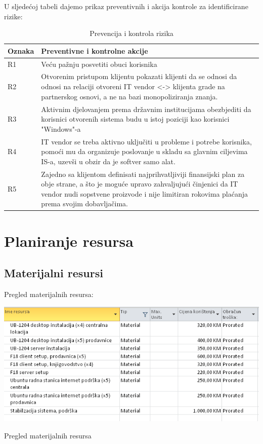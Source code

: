 \documentclass[times, utf8, seminar]{fit}
\begin{document}
U sljedećoj tabeli dajemo prikaz preventivnih i akcija kontrole za identificirane rizike:

\begin{table}[!h]
\centering
\begin{tabular}{|p{1.7cm}|p{13.2cm}|}
\hline
Oznaka & Preventivne i kontrolne akcije  \\ \hline\hline
R1 & Veću pažnju posvetiti obuci korisnika \\ \hline
R2 & Otvorenim pristupom klijentu pokazati klijenti da se odnosi da odnosi na relaciji otvoreni IT vendor <-> klijenta grade na partnerskog osnovi, a ne na bazi monopoliziranja znanja.\\ \hline
R3 & Aktivnim djelovanjem prema državnim institucijama obezbjediti da korisnici otvorenih sistema budu u istoj poziciji kao korisnici "Windows"-a\\ \hline 
R4 & IT vendor se treba aktivno uključiti u probleme i potrebe korisnika, pomoći mu da organizuje poslovanje u skladu sa  glavnim ciljevima IS-a, uzevši u obzir da je softver samo alat.\\ \hline
R5 & Zajedno sa klijentom definisati najprihvatljiviji finansijski plan za obje strane, a što je moguće upravo zahvaljujući činjenici da IT vendor nudi sopstvene proizvode i nije limitiran rokovima plaćanja prema svojim dobavljačima.\\ \hline
\end{tabular}
\caption{Prevencija i kontrola rizika}
\end{table}

\section{Planiranje resursa}
\subsection{Materijalni resursi}
Pregled materijalnih resursa:
\begin{table}[h]
\centering
\includegraphics[width=15cm]{img/materijalni_resursi.png}
\caption{Pregled materijalnih resursa}
\end{table}
\end{document}
